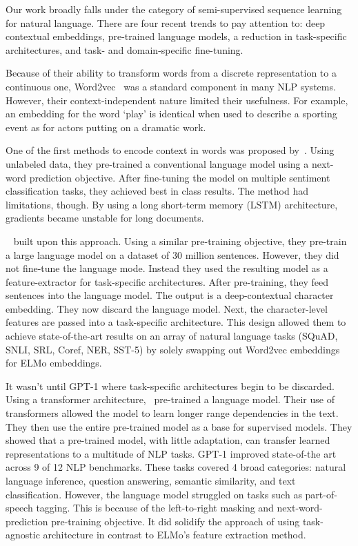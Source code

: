 Our work broadly falls under the category of semi-supervised sequence learning for natural language.
There are four recent trends to pay attention to: deep contextual embeddings, pre-trained language models, a reduction in task-specific architectures, and task- and domain-specific fine-tuning.

Because of their ability to transform words from a discrete representation to a continuous one, Word2vec~\citep{mikolov2013efficient} was a standard component in many NLP systems.
However, their context-independent nature limited their usefulness.
For example, an embedding for the word ‘play’ is identical when used to describe a sporting event as for actors putting on a dramatic work.

One of the first methods to encode context in words was proposed by~\cite{dai2015semisupervised}.
Using unlabeled data, they pre-trained a conventional language model using a next-word prediction objective.
After fine-tuning the model on multiple sentiment classification tasks, they achieved best in class results.
The method had limitations, though.
By using a long short-term memory (LSTM) architecture, gradients became unstable for long documents.

~\cite{peters2018deep} built upon this approach.
Using a similar pre-training objective, they pre-train a large language model on a dataset of 30 million sentences.
However, they did not fine-tune the language mode.
Instead they used the resulting model as a feature-extractor for task-specific architectures.
After pre-training, they feed sentences into the language model.
The output is a deep-contextual character embedding.
They now discard the language model.
Next, the character-level features are passed into a task-specific architecture.
This design allowed them to achieve state-of-the-art results on an array of natural language tasks (SQuAD, SNLI, SRL, Coref, NER, SST-5) by solely swapping out Word2vec embeddings for ELMo embeddings.

It wasn’t until GPT-1 where task-specific architectures begin to be discarded.
Using a transformer architecture,~\cite{radford2018improving} pre-trained a language model.
Their use of transformers allowed the model to learn longer range dependencies in the text.
They then use the entire pre-trained model as a base for supervised models.
They showed that a pre-trained model, with little adaptation, can transfer learned representations to a multitude of NLP tasks.
GPT-1 improved state-of-the art across 9 of 12 NLP benchmarks.
These tasks covered 4 broad categories: natural language inference, question answering, semantic similarity, and text classification.
However, the language model struggled on tasks such as part-of-speech tagging.
This is because of the left-to-right masking and next-word-prediction pre-training objective.
It did solidify the approach of using task-agnostic architecture in contrast to ELMo’s feature extraction method.

